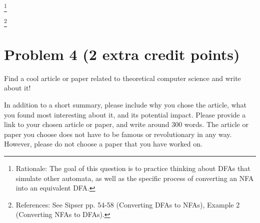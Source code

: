 \documentclass[letterpaper,11pt,twoside]{article}
\theoremstyle{plain}
\theoremstyle{definition}
\theoremstyle{remark}
\theoremstyle{restate}
\newcommand\blfootnote[1]{%
  \begingroup
  \renewcommand\thefootnote{}\footnote{#1}%
  \addtocounter{footnote}{-1}%
  \endgroup
}
\begin{document}
    \blfootnote{ Rationale: The goal of this question is to practice thinking about DFAs that simulate other automata, as well as the specific process of converting an NFA into an equivalent DFA. }
    \blfootnote{ References: See Sipser pp. 54-58 (Converting DFAs to NFAs), Example 2 (Converting NFAs to DFAs). }

\clearpage
\section{Problem 4 (2 extra credit points)}
Find a cool article or paper related to theoretical computer science and write about it!

In addition to a short summary, please include why you chose the article, what you found most interesting about it, and its potential impact. Please provide a link to your chosen article or paper, and write around 300 words. The article or paper you choose does not have to be famous or revolutionary in any way. However, please do not choose a paper that you have worked on.
\end{document}
